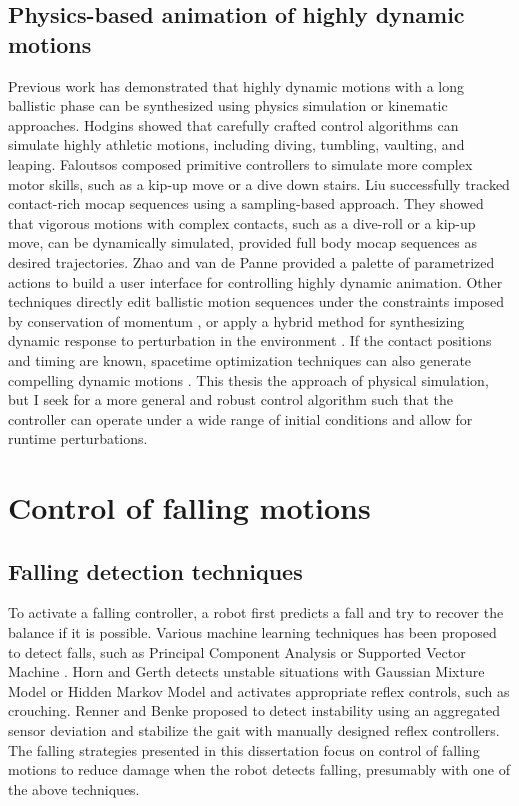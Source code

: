 \subsection{Physics-based animation of highly dynamic motions}
Previous work has demonstrated that highly
dynamic motions with a long ballistic phase can be synthesized using
physics simulation or kinematic approaches. Hodgins \etal
\cite{Hodgins:1995:AHA,Wooten:1998:Phd} showed that carefully
crafted control algorithms can simulate highly athletic motions,
including diving, tumbling, vaulting, and leaping. Faloutsos \etal
\cite{Faloutsos:2001:CCF} composed primitive controllers to
simulate more complex motor skills, such as a kip-up move or a dive
down stairs. Liu \etal \cite{Liu:2010:SCM} successfully tracked
contact-rich mocap sequences using a sampling-based approach. They
showed that vigorous motions with complex contacts, such as a
dive-roll or a kip-up move, can be dynamically simulated, provided
full body mocap sequences as desired trajectories. Zhao and van de
Panne \cite{Zhao:2005:UII} provided a palette of parametrized
actions to build a user interface for controlling highly dynamic
animation.  Other techniques directly edit ballistic motion sequences
under the constraints imposed by conservation of momentum
\cite{Majkowska:2007:FPM,Sok:2010:EDH}, or apply a hybrid method for
synthesizing dynamic response to perturbation in the environment
\cite{Shapiro:2003:HCI}.  If the contact positions and timing are
known, spacetime optimization techniques can also generate compelling
dynamic motions
\cite{Liu:2002:SCD,Fang:2003:ESP,Safonova:2004:SPR,Sulejmanpavic:2004:APB}.
This thesis the approach of physical simulation, 
but I seek for a more general and robust control algorithm such that the
controller can operate under a wide range of initial conditions and
allow for runtime perturbations. 



\section{Control of falling motions}
\label{sec:related_falling}

\subsection{Falling detection techniques}
To activate a falling controller, a robot first predicts a fall and
try to recover the balance if it is possible.
Various machine learning techniques has been proposed to detect falls, such as
Principal Component Analysis \cite{Karssen:2008:FDW} or 
Supported Vector Machine \cite{Kim:2011:MLA}.
Horn and Gerth \cite{Hohn:2009:PBM} detects unstable situations with
Gaussian Mixture Model or Hidden Markov Model
and activates appropriate reflex controls, such as crouching. 
Renner and Benke \cite{Renner:2006:IDF} proposed to detect instability using
an aggregated sensor deviation and stabilize the gait with manually designed
reflex controllers. 
The falling strategies presented in this dissertation focus
on control of falling motions to reduce damage when the
robot detects falling, presumably with one of the above techniques. 

